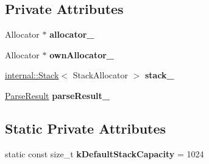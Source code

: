 \subsection*{Private Attributes}
\begin{DoxyCompactItemize}
\item 
Allocator $\ast$ {\bfseries allocator\+\_\+}\hypertarget{class_generic_document_a9b5f15fc75c8035612c37f796548e87a}{}\label{class_generic_document_a9b5f15fc75c8035612c37f796548e87a}

\item 
Allocator $\ast$ {\bfseries own\+Allocator\+\_\+}\hypertarget{class_generic_document_ada153f6865201106b3a753861c870266}{}\label{class_generic_document_ada153f6865201106b3a753861c870266}

\item 
\hyperlink{classinternal_1_1_stack}{internal\+::\+Stack}$<$ Stack\+Allocator $>$ {\bfseries stack\+\_\+}\hypertarget{class_generic_document_ad2169359326bdf8a7180338fec77e77f}{}\label{class_generic_document_ad2169359326bdf8a7180338fec77e77f}

\item 
\hyperlink{struct_parse_result}{Parse\+Result} {\bfseries parse\+Result\+\_\+}\hypertarget{class_generic_document_a499058f1c615928337d96cfaf374373e}{}\label{class_generic_document_a499058f1c615928337d96cfaf374373e}

\end{DoxyCompactItemize}
\subsection*{Static Private Attributes}
\begin{DoxyCompactItemize}
\item 
static const size\+\_\+t {\bfseries k\+Default\+Stack\+Capacity} = 1024\hypertarget{class_generic_document_a90d452abe8940d8a9c9634d1c49d8f49}{}\label{class_generic_document_a90d452abe8940d8a9c9634d1c49d8f49}

\end{DoxyCompactItemize}
